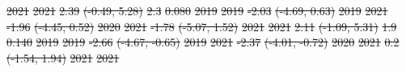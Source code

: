 \documentclass[
  letterpaper,
  DIV=11,
  numbers=noendperiod]{scrartcl}
\providecommand{\DIFdel}[1]{{\protect\color{red}\sout{#1}}}                      %
\providecommand{\DIFdelFL}[1]{\DIFdel{#1}} %
\begin{document}
\DIFdelFL{\hspace{1em}2021 }%
\DIFdelFL{2021 }%
\DIFdelFL{2.39 }%
\DIFdelFL{(-0.49, 5.28) }%
\DIFdelFL{2.3 }%
\DIFdelFL{0.080}%
\DIFdelFL{\hspace{1em}2019 }%
\DIFdelFL{2019 }%
\DIFdelFL{-2.03 }%
\DIFdelFL{(-4.69, 0.63) }%
\DIFdelFL{\hspace{1em}2019 }%
\DIFdelFL{2021 }%
\DIFdelFL{-1.96 }%
\DIFdelFL{(-4.45, 0.52) }%
\DIFdelFL{\hspace{1em}2020 }%
\DIFdelFL{2021 }%
\DIFdelFL{-1.78 }%
\DIFdelFL{(-5.07, 1.52) }%
\DIFdelFL{\hspace{1em}2021 }%
\DIFdelFL{2021 }%
\DIFdelFL{2.11 }%
\DIFdelFL{(-1.09, 5.31) }%
\DIFdelFL{1.9 }%
\DIFdelFL{0.140}%
\DIFdelFL{\hspace{1em}2019 }%
\DIFdelFL{2019 }%
\DIFdelFL{-2.66 }%
\DIFdelFL{(-4.67, -0.65) }%
\DIFdelFL{\hspace{1em}2019 }%
\DIFdelFL{2021 }%
\DIFdelFL{-2.37 }%
\DIFdelFL{(-4.01, -0.72) }%
\DIFdelFL{\hspace{1em}2020 }%
\DIFdelFL{2021 }%
\DIFdelFL{0.2 }%
\DIFdelFL{(-1.54, 1.94) }%
\DIFdelFL{\hspace{1em}2021 }%
\DIFdelFL{2021 }%
\end{document}
